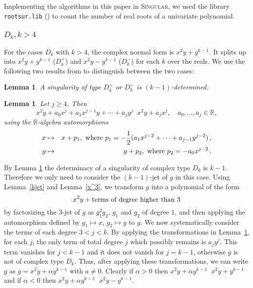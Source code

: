 \documentclass[noend]{amsproc}
\newtheorem{lemma}[theorem]{Lemma}
\DeclareMathOperator{\requiv}{\overset{r}{\sim}}
\begin{document}
Implementing the algorithms in this paper in \textsc{Singular}, we used the
library \texttt{rootsur.lib} (\cite{roots}) to count the number of real roots
of a univariate polynomial.

\subsubsection{$D_k, k > 4$}

For the cases $D_k$ with $k > 4$, the complex normal form is $x^2y+y^{k-1}$. It
splits up into $x^2y+y^{k-1}$ ($D_k^+$) and $x^2y-y^{k-1}$ ($D_k^-$) for each
$k$ over the reals. We use the following two results from \cite{Siersma} to
distinguish between the two cases:

\begin{lemma}\label{kDeterminacyD[k]k>4}
A singularity of type $D_k^+$ or $D_k^-$ is $(k-1)$-determined.
\end{lemma}

\begin{lemma}\label{transformationD[k]}
Let $j\ge 4$. Then
\[
x^2y+a_0x^j+a_1x^{j-1}y+\cdots+a_jy^j\requiv x^2y+a_jx^j,
\quad a_0,\ldots,a_j\in\mathbb R,
\]
using the $\mathbb R$-algebra automorphisms
\begin{eqnarray*}
x&\mapsto&x+p_1,\textnormal{ where }
p_1=-\frac{1}{2}(a_1x^{j-2}+\cdots+a_{j-1}y^{j-2})\,,\\
y&\mapsto&y+p_2,\textnormal{ where } p_2=-a_0x^{j-2} \,.
\end{eqnarray*}
\end{lemma}

By Lemma \ref{kDeterminacyD[k]k>4} the determinacy of a singularity of  complex
type
$D_k$ is $k-1$. Therefore we only need to consider the
$(k-1)$-jet of $g$ in this case. Using Lemma~\ref{kjet} and Lemma~\ref{x^3}, we
transform $g$ into a polynomial of the form
\[x^2y+\textnormal{terms of degree higher than $3$}\]
by factorizing the $3$-jet of $g$ as $g_1^2g_2$, $g_1$ and $g_2$ of
degree $1$,
and then applying the automorphism defined by $g_1\mapsto x$, $g_2\mapsto y$ to
$g$. We
now systematically consider the terms of each degree $3<j<k$. By applying the
transformations in Lemma~\ref{transformationD[k]}, for each $j$, the only term
of total degree $j$ which possibly remains is $a_jy^j$. This term vanishes for
$j<k-1$ and it does not vanish for $j=k-1$, otherwise $g$ is not of complex
type $D_k$. Thus, after applying these transformations,
we can write $g$ as $g=x^2y+\alpha y^{k-1}$ with $a\neq0$. Clearly if $\alpha>0$ then
$x^2y+\alpha y^{k-1}\requiv x^2y+y^{k-1}$ and if $\alpha<0$ then
$x^2y+\alpha y^{k-1}\requiv x^2y-y^{k-1}$.
\end{document}
